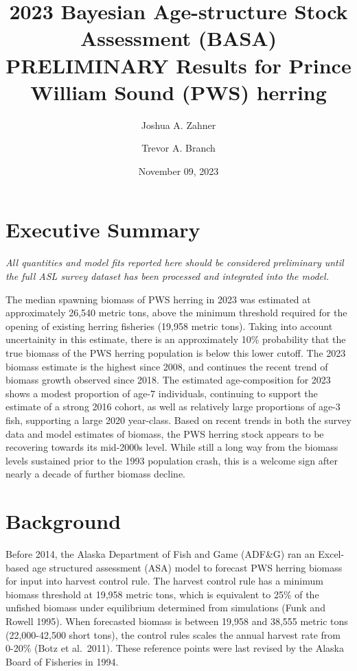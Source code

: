\documentclass[
  11pt,
]{article}
\title{2023 Bayesian Age-structure Stock Assessment (BASA) PRELIMINARY
Results for Prince William Sound (PWS) herring}
\author{Joshua A. Zahner \and Trevor A. Branch}
\date{November 09, 2023}
\begin{document}
\maketitle

\hypertarget{executive-summary}{%
\section{Executive Summary}\label{executive-summary}}

\emph{All quantities and model fits reported here should be considered
preliminary until the full ASL survey dataset has been processed and
integrated into the model.}

The median spawning biomass of PWS herring in 2023 was estimated at
approximately 26,540 metric tons, above the minimum threshold required
for the opening of existing herring fisheries (19,958 metric tons).
Taking into account uncertainity in this estimate, there is an
approximately 10\% probability that the true biomass of the PWS herring
population is below this lower cutoff. The 2023 biomass estimate is the
highest since 2008, and continues the recent trend of biomass growth
observed since 2018. The estimated age-composition for 2023 shows a
modest proportion of age-7 individuals, continuing to support the
estimate of a strong 2016 cohort, as well as relatively large
proportions of age-3 fish, supporting a large 2020 year-class. Based on
recent trends in both the survey data and model estimates of biomass,
the PWS herring stock appears to be recovering towards its mid-2000s
level. While still a long way from the biomass levels sustained prior to
the 1993 population crash, this is a welcome sign after nearly a decade
of further biomass decline.

\hypertarget{background}{%
\section{Background}\label{background}}

Before 2014, the Alaska Department of Fish and Game (ADF\&G) ran an
Excel-based age structured assessment (ASA) model to forecast PWS
herring biomass for input into harvest control rule. The harvest control
rule has a minimum biomass threshold at 19,958 metric tons, which is
equivalent to 25\% of the unfished biomass under equilibrium determined
from simulations (Funk and Rowell 1995). When forecasted biomass is
between 19,958 and 38,555 metric tons (22,000-42,500 short tons), the
control rules scales the annual harvest rate from 0-20\% (Botz et
al.~2011). These reference points were last revised by the Alaska Board
of Fisheries in 1994.
\end{document}
